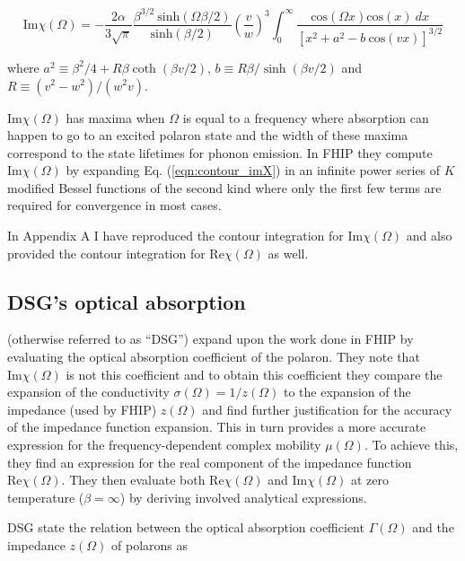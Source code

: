 \begin{equation}\label{eqn:contour_imX}
    \textrm{Im}\chi(\Omega) = - \frac{2 \alpha}{3 \sqrt{\pi}} \frac{\beta^{3/2}\ \textrm{sinh}(\Omega \beta / 2)}{\textrm{sinh}(\beta / 2)} \left( \frac{v}{w} \right)^3 \int_0^\infty \frac{\textrm{cos}(\Omega x) \textrm{cos}(x)\ dx}{\left[x^2 + a^2 - b\ \textrm{cos}(vx) \right]^{3/2}}
\end{equation}

where $a^2 \equiv \beta^2 / 4 + R \beta \coth (\beta v / 2)$, $b \equiv R\beta / \sinh(\beta v / 2)$ and $R \equiv (v^2 - w^2) / (w^2 v)$. 

$\text{Im} \chi(\Omega)$ has maxima when $\Omega$ is equal to a frequency where absorption can happen to go to an excited polaron state and the width of these maxima correspond to the state lifetimes for phonon emission. In FHIP they compute $\text{Im}\chi(\Omega)$ by expanding Eq. (\ref{eqn:contour_imX}) in an infinite power series of $K$ modified Bessel functions of the second kind where only the first few terms are required for convergence in most cases.  

In Appendix A I have reproduced the contour integration for $\text{Im}\chi(\Omega)$ and also provided the contour integration for $\text{Re}\chi(\Omega)$ as well.

\subsection{DSG's optical absorption}

\cite{devreese_optical_1972} (otherwise referred to as ``DSG'') expand upon the work done in FHIP by evaluating the optical absorption coefficient of the polaron. They note that $\text{Im}\chi(\Omega)$ is not this coefficient and to obtain this coefficient they compare the expansion of the conductivity $\sigma(\Omega) = 1 / z(\Omega)$ to the expansion of the impedance (used by FHIP) $z(\Omega)$ and find further justification for the accuracy of the impedance function expansion. This in turn provides a more accurate expression for the frequency-dependent complex mobility $\mu(\Omega)$. To achieve this, they find an expression for the real component of the impedance function $\text{Re}\chi(\Omega)$. They then evaluate both $\text{Re}\chi(\Omega)$ and $\text{Im}\chi(\Omega)$ at zero temperature ($\beta = \infty$) by deriving involved analytical expressions. 

DSG state the relation between the optical absorption coefficient $\Gamma(\Omega)$ and the impedance $z(\Omega)$ of polarons as

